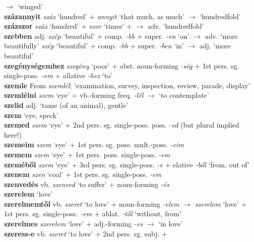 \documentclass[11pt]{article}
\begin{document}
$\rightarrow$ `winged' \\
\textbf{százannyit} \emph{száz} `hundred' + \emph{annyit} `that much,
as much' $\rightarrow$ `hundredfold' \\
\textbf{százszor} \emph{száz} `hundred' + \emph{szor} `times` + $\rightarrow$ adv. `hundredfold' \\
\textbf{szebben} adj. \emph{szép} `beautiful' + comp. \emph{-bb} +
super. \emph{-en} `on' $\rightarrow$ adv. `more
beautifully' \textbar\textbar{} \emph{szép} `beautiful' +
comp. \emph{-bb} + super. \emph{-ben} `in' $\rightarrow$ adj. `more
beautiful' \\
\textbf{szegénységemhez} \emph{szegény} `poor' +
abst. noun\hyp{}forming \emph{-ség} + 1st pers. sg. single\hyp{}poss. \emph{-em} +
allative \emph{-hez} `to' \\
\textbf{szemle} From \emph{szemlél}; `examination, survey,
inspection, review, parade, display' \\
\textbf{szemlélni} \emph{szem} `eye' + vb.\hyp{}forming
freq. \emph{-lél} $\rightarrow$ `to contemplate' \\
\textbf{szelid} adj. `tame (of an animal), gentle' \\
\textbf{szem} `eye, speck' \\
\textbf{szemed} \emph{szem} `eye' + 2nd
pers. sg. single\hyp{}poss. poss. \emph{-ed} (but plural implied
here!) \\
\textbf{szemeim} \emph{szem} `eye' + 1st
pers. sg. poss. mult.\hyp{}poss. \emph{-eim} \\
\textbf{szemem} \emph{szem} `eye' + 1st
pers. poss. single\hyp{}poss. \emph{-em} \\
\textbf{szeméből} \emph{szem} `eye' + 3rd
pers. sg. single\hyp{}poss. \emph{-e} + elative \emph{-ből} `from, out
of' \\
\textbf{szenem} \emph{szen} `coal' + 1st pers. sg. single\hyp{}poss. \emph{-em} \\
\textbf{szenvedés} vb. \emph{szenved} `to suffer' +
noun\hyp{}forming \emph{-és} \\
\textbf{szerelem} `love' \\
\textbf{szerelmemtől} vb. \emph{szeret} `to love' +
noun\hyp{}forming \emph{-elem} $\rightarrow$ \emph{szerelem} `love' +
1st pers. sg. single\hyp{}poss. \emph{-em} + ablat. \emph{-től}
`without, from' \\
\textbf{szerelmes} \emph{szerelem} `love' +
adj.\hyp{}forming \emph{-es} $\rightarrow$ `in love' \\
\textbf{szeress-e} vb. \emph{szeret} `to love' + 2nd pers. sg. subj. +
\end{document}
